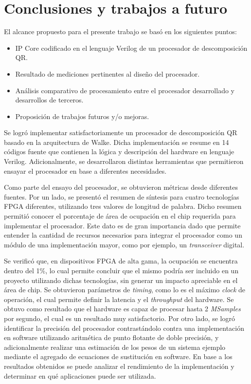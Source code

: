 \chapter{Conclusiones y trabajos a futuro}

El alcance propuesto para el presente trabajo se basó en los siguientes puntos:

\begin{itemize}
    \item IP Core codificado en el lenguaje Verilog de un procesador de descomposición QR.
    \item Resultado de mediciones pertinentes al diseño del procesador.
    \item Análisis comparativo de procesamiento entre el procesador desarrollado y desarrollos de terceros.
    \item Proposición de trabajos futuros y/o mejoras.
\end{itemize}

Se logró implementar satisfactoriamente un procesador de descomposición QR basado en la arquitectura de Walke\cite{Walke}. Dicha implementación se resume en 14 códigos fuente que contienen la lógica y descripción del hardware en lenguaje Verilog. Adicionalmente, se desarrollaron distintas herramientas que permitieron ensayar el procesador en base a diferentes necesidades.

Como parte del ensayo del procesador, se obtuvieron métricas desde diferentes fuentes. Por un lado, se presentó el resumen de síntesis para cuatro tecnologías FPGA diferentes, utilizando tres valores de longitud de palabra. Dicho resumen permitió conocer el porcentaje de área de ocupación en el chip requerida para implementar el procesador. Este dato es de gran importancia dado que permite entender la cantidad de recursos necesarios para integrar el procesador como un módulo de una implementación mayor, como por ejemplo, un \textit{transceiver} digital.

Se verificó que, en dispositivos FPGA de alta gama, la ocupación se encuentra dentro del 1\%, lo cual permite concluir que el mismo podría ser incluido en un proyecto utilizando dichas tecnologías, sin generar un impacto apreciable en el área de chip. Se obtuvieron parámetros de \textit{timing}, como lo es el máximo \textit{clock} de operación, el cual permite definir la latencia y el \textit{throughput} del hardware. Se obtuvo como resultado que el hardware es capaz de procesar hasta 2 \textit{MSamples} por segundo, el cual es un resultado muy satisfactorio. Por otro lado, se logró identificar la precisión del procesador contrastándolo contra una implementación en software utilizando aritmética de punto flotante de doble precisión, y adicionalmente realizar una estimación de los pesos de un sistema ejemplo mediante el agregado de ecuaciones de sustitución en software. En base a los resultados obtenidos se puede analizar el rendimiento de la implementación y determinar en qué aplicaciones puede ser utilizada.

